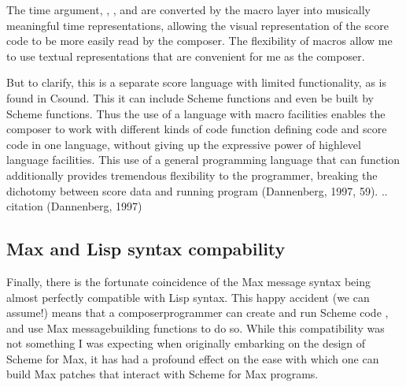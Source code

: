\documentclass[letterpaper,10pt,english]{sphinxmanual}
\begin{document}
\begin{sphinxVerbatim}[commandchars=\\\{\}]
\end{sphinxVerbatim}

\sphinxAtStartPar
The time argument, , , and  are converted by the macro layer into musically meaningful time
representations, allowing the visual representation of the score code to be more easily read by the composer.
The flexibility of macros allow me to use textual representations that are convenient for me as the composer.

\sphinxAtStartPar
But to clarify, this is  a separate score language with limited functionality, as is found in Csound.
This  \sphinxhyphen{} it can include  Scheme functions and even be built by Scheme functions.
Thus the use of a language with macro facilities enables the composer to work with different kinds of code
\sphinxhyphen{} function defining code and score code \sphinxhyphen{} in one language, without giving up the expressive power of high\sphinxhyphen{}level language
facilities. This use of a general programming language that can function additionally 
provides tremendous flexibility to the programmer, breaking the dichotomy between score data and running program  (Dannenberg, 1997, 5\sphinxhyphen{}9).
.. citation (Dannenberg, 1997)


\subsection{Max and Lisp syntax compability}
\label{\detokenize{design:max-and-lisp-syntax-compability}}
\sphinxAtStartPar
Finally, there is the fortunate coincidence of the Max message syntax being almost perfectly compatible with Lisp syntax.
This happy accident (we can assume!) means that a composer\sphinxhyphen{}programmer can create and run Scheme code , and
use Max message\sphinxhyphen{}building functions to do so.
While this compatibility was not something I was expecting when originally embarking on the design of Scheme for Max,
it has had a profound effect on the ease with which one can build Max patches that interact with Scheme for Max programs.
\end{document}

